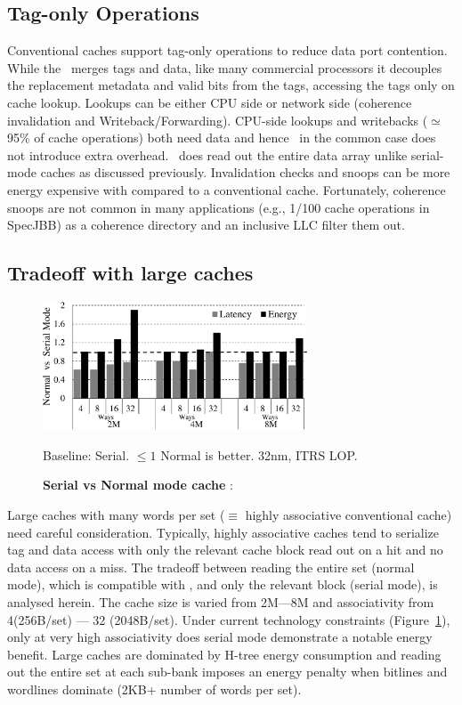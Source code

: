 \subsection{Tag-only Operations}  

Conventional caches support tag-only operations to reduce data port contention. While the \AC\ merges tags and data, like many commercial processors it decouples the replacement metadata and valid bits from the tags, accessing the tags only on cache lookup. Lookups can be either CPU side or network side (coherence invalidation and Writeback/Forwarding). CPU-side lookups and writebacks ($\simeq$ 95\% of cache operations) both need data and hence \AC\ in the common case does not introduce extra overhead. \AC\ does read out the entire data array unlike serial-mode caches as discussed previously. Invalidation checks and snoops can be more energy expensive with \AC{} compared to a conventional cache. Fortunately, coherence snoops are not common in many applications (e.g., 1/100 cache operations in SpecJBB) as a coherence directory and an inclusive LLC filter them out.


\subsection{Tradeoff with large caches} 
\label{sec:tradeoff_with_large_caches} %

\begin{figure}[h] 
\centering
\includegraphics[width=0.7\textwidth]{files/Plots/07-Serial_vs_Normal.pdf}

Baseline: Serial. $\leq1$ Normal is better.  32nm, ITRS  LOP. 
\caption[Serial vs. Normal - Latency and Energy]{\textbf{Serial vs Normal mode cache} : }
\label{fig:serial_normal_graph} 
\end{figure}

Large caches with many words per set ($\equiv$ highly associative conventional cache) need careful consideration. Typically, highly associative caches tend to serialize tag and data access with only the relevant cache block read out on a hit and no data access on a miss. The tradeoff between reading the entire set (normal mode), which is compatible with \AC{}, and only the relevant block (serial mode), is analysed herein. The cache size is varied from 2M---8M and associativity from 4(256B/set) --- 32 (2048B/set).  Under current technology constraints (Figure~\ref{fig:serial_normal_graph}), only at very high associativity does serial mode demonstrate a notable energy benefit. Large caches are dominated by H-tree energy consumption and reading out the entire set at each sub-bank imposes an energy penalty when bitlines and wordlines dominate (2KB+ number of words per set).


